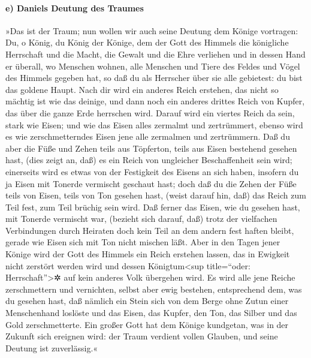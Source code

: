 \hypertarget{e-daniels-deutung-des-traumes}{%
\paragraph{e) Daniels Deutung des
Traumes}\label{e-daniels-deutung-des-traumes}}

»Das ist der Traum; nun wollen wir auch seine Deutung dem
Könige vortragen: Du, o König, du König der Könige, dem
der Gott des Himmels die königliche Herrschaft und die Macht, die Gewalt
und die Ehre verliehen und in dessen Hand er überall, wo
Menschen wohnen, alle Menschen und Tiere des Feldes und Vögel des
Himmels gegeben hat, so daß du als Herrscher über sie alle gebietest: du
bist das goldene Haupt. Nach dir wird ein anderes Reich
erstehen, das nicht so mächtig ist wie das deinige, und dann noch ein
anderes drittes Reich von Kupfer, das über die ganze Erde herrschen
wird. Darauf wird ein viertes Reich da sein, stark wie
Eisen; und wie das Eisen alles zermalmt und zertrümmert, ebenso wird es
wie zerschmetterndes Eisen jene alle zermalmen und zertrümmern.
Daß du aber die Füße und Zehen teils aus Töpferton, teils
aus Eisen bestehend gesehen hast, (dies zeigt an, daß) es ein Reich von
ungleicher Beschaffenheit sein wird; einerseits wird es etwas von der
Festigkeit des Eisens an sich haben, insofern du ja Eisen mit Tonerde
vermischt geschaut hast; doch daß du die Zehen der Füße
teils von Eisen, teils von Ton gesehen hast, (weist darauf hin, daß) das
Reich zum Teil fest, zum Teil brüchig sein wird. Daß
ferner das Eisen, wie du gesehen hast, mit Tonerde vermischt war,
(bezieht sich darauf, daß) trotz der vielfachen Verbindungen durch
Heiraten doch kein Teil an dem andern fest haften bleibt, gerade wie
Eisen sich mit Ton nicht mischen läßt. Aber in den Tagen
jener Könige wird der Gott des Himmels ein Reich erstehen lassen, das in
Ewigkeit nicht zerstört werden wird und dessen Königtum\textless sup
title=``oder: Herrschaft''\textgreater✲ auf kein anderes Volk übergehen
wird. Es wird alle jene Reiche zerschmettern und vernichten, selbst aber
ewig bestehen, entsprechend dem, was du gesehen hast, daß
nämlich ein Stein sich von dem Berge ohne Zutun einer Menschenhand
loslöste und das Eisen, das Kupfer, den Ton, das Silber und das Gold
zerschmetterte. Ein großer Gott hat dem Könige kundgetan, was in der
Zukunft sich ereignen wird: der Traum verdient vollen Glauben, und seine
Deutung ist zuverlässig.«

